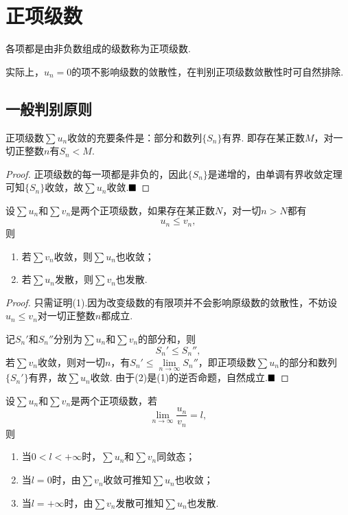 \section{正项级数}
\begin{definition}[正项级数]
	各项都是由非负数组成的级数称为{\heiti 正项级数}.
\end{definition}
\begin{remark}
	实际上，$u_n=0$的项不影响级数的敛散性，在判别正项级数敛散性时可自然排除.
\end{remark}
\subsection{一般判别原则}
\begin{theorem}
	正项级数$\sum u_n$收敛的充要条件是：部分和数列$\{S_n\}$有界. 即存在某正数$M$，对一切正整数$n$有$S_n<M$.
\end{theorem}
\begin{proof}
	正项级数的每一项都是非负的，因此$\{S_n\}$是递增的，由单调有界收敛定理可知$\{S_n\}$收敛，故$\sum u_n$收敛.$\hfill\blacksquare$
\end{proof}
\begin{theorem}[比较原则]
	设$\sum u_n$和$\sum v_n$是两个正项级数，如果存在某正数$N$，对一切$n>N$都有
	$$u_n\leqslant v_n,$$
	则
	\begin{enumerate}[(1)]
		\item 若$\sum v_n$收敛，则$\sum u_n$也收敛；
		\item 若$\sum u_n$发散，则$\sum v_n$也发散.
	\end{enumerate}
\end{theorem}
\begin{proof}
	只需证明(1).因为改变级数的有限项并不会影响原级数的敛散性，不妨设$u_n\leqslant v_n$对一切正整数$n$都成立.
	
	记$S_n'$和$S_n''$分别为$\sum u_n$和$\sum v_n$的部分和，则
	$$S_n'\leqslant S_n'',$$
	若$\sum v_n$收敛，则对一切$n$，有$S_n'\leqslant\lim\limits_{n\to\infty}S_n''$，即正项级数$\sum u_n$的部分和数列$\{S_n'\}$有界，故$\sum u_n$收敛. 由于(2)是(1)的逆否命题，自然成立.$\hfill\blacksquare$
\end{proof}
\begin{corollary}[比较原则的极限形式]
	设$\sum u_n$和$\sum v_n$是两个正项级数，若
	$$\lim\limits_{n\to\infty}\frac{u_n}{v_n}=l,$$
	则
	\begin{enumerate}[(1)]
		\item 当$0<l<+\infty$时，$\sum u_n$和$\sum v_n$同敛态；
		\item 当$l=0$时，由$\sum v_n$收敛可推知$\sum u_n$也收敛；
		\item 当$l=+\infty$时，由$\sum v_n$发散可推知$\sum u_n$也发散.
	\end{enumerate}
\end{corollary}
